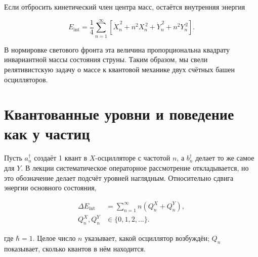 \begin{classroomqa}
\end{classroomqa}

Если отбросить кинетический член центра масс, остаётся внутренняя энергия

\begin{equation}
  E_{\mathrm{int}}
  =
  \frac14
  \sum_{n=1}^{\infty}
  \left[
    \dot X_n^{\,2}+n^2X_n^{\,2}
    +\dot Y_n^{\,2}+n^2Y_n^{\,2}
  \right].
  \label{eq:l02-internal-energy}
\end{equation}

В нормировке светового фронта эта величина пропорциональна квадрату инвариантной массы состояния струны. Таким образом, мы свели релятивистскую задачу о массе к квантовой механике двух счётных башен осцилляторов.

\section{Квантованные уровни и поведение как у частиц}

Пусть \(a_n^\dagger\) создаёт 1 квант в \(X\)-осцилляторе с частотой \(n\), а \(b_n^\dagger\) делает то же самое для \(Y\). В лекции систематическое операторное рассмотрение откладывается, но это обозначение делает подсчёт уровней наглядным. Относительно сдвига энергии основного состояния,

\begin{equation}
  \begin{aligned}
    \Delta E_{\mathrm{int}}
    &=\sum_{n=1}^{\infty}n\left(Q_n^X+Q_n^Y\right),\\
    Q_n^X,Q_n^Y&\in\{0,1,2,\ldots\}.
  \end{aligned}
  \label{eq:l02-quantized-energy}
\end{equation}

где \(\hbar=1\). Целое число \(n\) указывает, какой осциллятор возбуждён; \(Q_n\) показывает, сколько квантов в нём находится.

